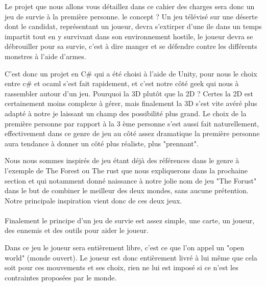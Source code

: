 \documentclass{article}
\begin{document}
\par
Le projet que nous allons vous détaillez dans ce cahier des charges sera donc un jeu de survie à la première personne. le concept ? Un jeu télévisé sur une déserte dont le candidat, représentant un joueur, devra s'extirper d'une ile dans un temps impartit tout en y survivant dans son environnement hostile, le joueur devra se débrouiller pour sa survie, c'est à dire manger et se défendre contre les différents monstres à l'aide d'armes.
\newline

\par
C'est donc un projet en C\# qui a été choisi à l'aide de Unity, pour nous le choix entre c# et ocaml s'est fait rapidement, et c'est notre côté geek qui nous à rassembler autour  d'un jeu. Pourquoi la 3D plutôt que la 2D ? Certes la 2D est certainement moins complexe à gérer, mais finalement la 3D s'est vite avéré plus adapté à notre je laissant un champ des possibilité plus grand. 
Le choix de la première personne par rapport à la 3 ème personne s'est aussi  fait naturellement, effectivement dans  ce genre de jeu au côté assez dramatique la première personne aura tendance à donner un côté plus réaliste, plus "prennant".
\newline

\par
Nous nous sommes inspirés de jeu étant déjà des références dans le genre à l'exemple de The Forest ou The rust que nous expliquerons dans la prochaine section et qui notamment donné naissance à notre jolie nom  de jeu  "The Forust" dans le but de combiner le meilleur des deux mondes, sans aucune prétention.
Notre principale inspiration vient donc de ces deux jeux.

\paragraph{}
Finalement le principe d'un jeu de survie est assez simple,  une carte, un joueur, des ennemis et des outils  pour aider le joueur. 

Dans ce jeu le joueur sera entièrement libre, c'est ce que  l'on appel un "open world" (monde ouvert). Le joueur  est donc entièrement  livré  à lui même que cela soit pour ces mouvements et   ses choix, rien ne lui est imposé si ce n'est les contraintes proposées par  le monde.
\newline
\end{document}
